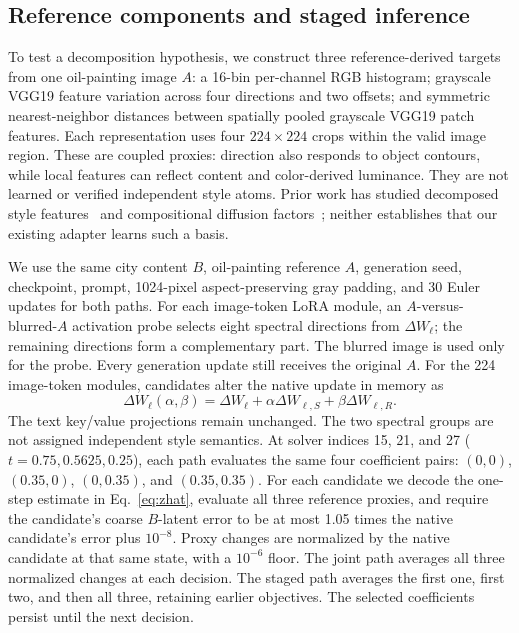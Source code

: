 \documentclass[10pt,letterpaper]{article}
\begin{document}
\subsection{Reference components and staged inference}
To test a decomposition hypothesis, we construct three reference-derived targets from one oil-painting image $A$: a 16-bin per-channel RGB histogram; grayscale VGG19 feature variation across four directions and two offsets; and symmetric nearest-neighbor distances between spatially pooled grayscale VGG19 patch features. Each representation uses four $224\times224$ crops within the valid image region. These are coupled proxies: direction also responds to object contours, while local features can reflect content and color-derived luminance. They are not learned or verified independent style atoms. Prior work has studied decomposed style features~\cite{styledecomp2018} and compositional diffusion factors~\cite{decompdiff2024}; neither establishes that our existing adapter learns such a basis.

We use the same city content $B$, oil-painting reference $A$, generation seed, checkpoint, prompt, 1024-pixel aspect-preserving gray padding, and 30 Euler updates for both paths. For each image-token LoRA module, an $A$-versus-blurred-$A$ activation probe selects eight spectral directions from $\Delta W_\ell$; the remaining directions form a complementary part. The blurred image is used only for the probe. Every generation update still receives the original $A$. For the 224 image-token modules, candidates alter the native update in memory as
\begin{equation}
\Delta W_\ell(\alpha,\beta)=\Delta W_\ell+\alpha\Delta W_{\ell,S}+\beta\Delta W_{\ell,R}.
\label{eq:parts}
\end{equation}
The text key/value projections remain unchanged. The two spectral groups are not assigned independent style semantics. At solver indices 15, 21, and 27 ($t=0.75,0.5625,0.25$), each path evaluates the same four coefficient pairs: $(0,0)$, $(0.35,0)$, $(0,0.35)$, and $(0.35,0.35)$. For each candidate we decode the one-step estimate in Eq.~\eqref{eq:zhat}, evaluate all three reference proxies, and require the candidate's coarse $B$-latent error to be at most 1.05 times the native candidate's error plus $10^{-8}$. Proxy changes are normalized by the native candidate at that same state, with a $10^{-6}$ floor. The joint path averages all three normalized changes at each decision. The staged path averages the first one, first two, and then all three, retaining earlier objectives. The selected coefficients persist until the next decision.
\end{document}
